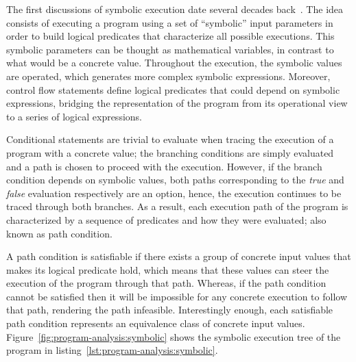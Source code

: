 

The first discussions of symbolic execution date several decades back~\cite{Hoare1969,King1976}. The idea consists of executing a program using a set of ``symbolic'' input parameters in order to build logical predicates that characterize all possible executions. This symbolic parameters can be thought as mathematical variables, in contrast to what would be a concrete value. Throughout the execution, the symbolic values are operated, which generates more complex symbolic expressions. Moreover, control flow statements define logical predicates that could depend on symbolic expressions, bridging the representation of the program from its operational view to a series of logical expressions. %

Conditional statements are trivial to evaluate when tracing the execution of a program with a concrete value; the branching conditions are simply evaluated and a path is chosen to proceed with the execution. However, if the branch condition depends on symbolic values, both paths corresponding to the \textit{true} and \textit{false} evaluation respectively are an option, hence, the execution continues to be traced through both branches. As a result, each execution path of the program is characterized by a sequence of predicates and how they were evaluated; also known as path condition.

A path condition is satisfiable if there exists a group of concrete input values that makes its logical predicate hold, which means that these values can steer the execution of the program through that path. Whereas, if the path condition cannot be satisfied then it will be impossible for any concrete execution to follow that path, rendering the path infeasible. Interestingly enough, each satisfiable path condition represents an equivalence class of concrete input values.
Figure~\ref{fig:program-analysis:symbolic} shows the symbolic execution tree of the program in listing~\ref{lst:program-analysis:symbolic}.

